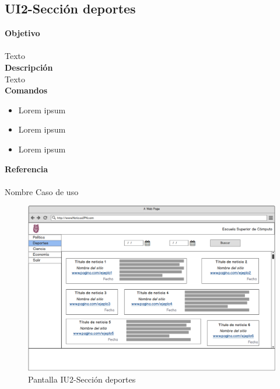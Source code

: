 \subsection{UI2-Sección deportes}

\Large{\textbf{Objetivo}}\\\\
\normalsize{Texto}\\



\Large{\textbf{Descripción}}\\
\normalsize{Texto}\\


\Large{\textbf{Comandos}}\\
\normalsize{}

\begin{itemize}
	\item Lorem ipsum
	\item Lorem ipsum
	\item Lorem ipsum
\end{itemize}

\Large{\textbf{Referencia}}\\\\
\normalsize{Nombre Caso de uso}

\begin{figure}
  \centering
	\includegraphics[scale=.3]{imagenes/Pantallas/UI2}
  \caption{Pantalla IU2-Sección deportes}
  \label{fig:IU2}
\end{figure}